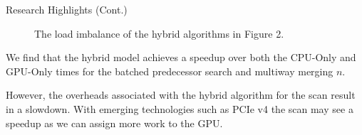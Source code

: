 \documentclass[final]{beamer}
\newlength{\colwidth}
\begin{document}
\begin{frame}[t]
\begin{columns}[t]
\begin{column}{\colwidth}
\begin{block}{Research Highlights (Cont.)}
\begin{figure}[t]
\centering
{}
    \caption{The load imbalance of the hybrid algorithms in Figure 2.}
   \label{fig:scan_results}
\end{figure}

\end{block} 
\begin{description}[font=$\bullet$~\normalfont\scshape\color{red!50!black}]
\item We find that the hybrid model achieves a speedup over both the CPU-Only and GPU-Only times for the batched predecessor search and multiway merging $n$. 
\item However, the overheads associated with the hybrid algorithm for the scan result in a slowdown. With emerging technologies such as PCIe v4 the scan may see
  a speedup as we can assign more work to the GPU.
\end{description}


\end{column}
\end{columns}
\end{frame}
\end{document}
